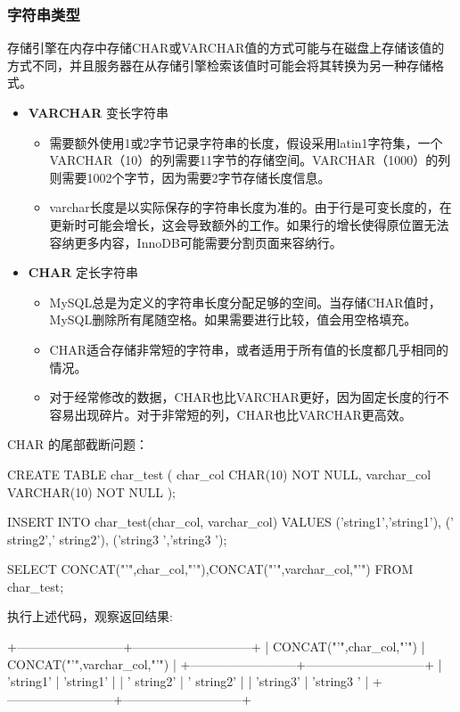 \subsubsection{字符串类型}

存储引擎在内存中存储CHAR或VARCHAR值的方式可能与在磁盘上存储该值的方式不同，并且服务器在从存储引擎检索该值时可能会将其转换为另一种存储格式。

\begin{itemize}
    \item \textbf{VARCHAR} 变长字符串
    \begin{itemize}
        \item 需要额外使用1或2字节记录字符串的长度，假设采用latin1字符集，一个VARCHAR（10）的列需要11字节的存储空间。VARCHAR（1000）的列则需要1002个字节，因为需要2字节存储长度信息。
        \item varchar长度是以实际保存的字符串长度为准的。由于行是可变长度的，在更新时可能会增长，这会导致额外的工作。如果行的增长使得原位置无法容纳更多内容，InnoDB可能需要分割页面来容纳行。
    \end{itemize}    
    
    \item \textbf{CHAR} 定长字符串
    
    \begin{itemize}
        \item MySQL总是为定义的字符串长度分配足够的空间。当存储CHAR值时，MySQL删除所有尾随空格。如果需要进行比较，值会用空格填充。
        \item CHAR适合存储非常短的字符串，或者适用于所有值的长度都几乎相同的情况。
        \item 对于经常修改的数据，CHAR也比VARCHAR更好，因为固定长度的行不容易出现碎片。对于非常短的列，CHAR也比VARCHAR更高效。
    \end{itemize}
\end{itemize}

CHAR 的尾部截断问题：
\begin{sql}
CREATE TABLE char_test (
    char_col CHAR(10) NOT NULL,
    varchar_col VARCHAR(10) NOT NULL
);

INSERT INTO char_test(char_col, varchar_col) VALUES
    ('string1','string1'),
    (' string2',' string2'), 
    ('string3 ','string3 ');

SELECT CONCAT("'",char_col,"'"),CONCAT("'",varchar_col,"'") FROM char_test;
\end{sql}

执行上述代码，观察返回结果:

\begin{sql}
+--------------------------+-----------------------------+
| CONCAT("'",char_col,"'") | CONCAT("'",varchar_col,"'") |
+--------------------------+-----------------------------+
| 'string1'                | 'string1'                   |
| ' string2'               | ' string2'                  |
| 'string3'                | 'string3 '                  |
+--------------------------+-----------------------------+
\end{sql}

